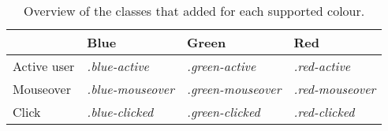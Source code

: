 \begin{table}%
	\begin{center}
		\begin{tabular}{l | l l l}
			\hline
			& \textbf{Blue}		& \textbf{Green} & \textbf{Red}
			\\
			\hline
			Active user &	\textit{.blue-active}	& \textit{.green-active} & \textit{.red-active} \\
			Mouseover 	&	\textit{.blue-mouseover}	& \textit{.green-mouseover} & \textit{.red-mouseover} \\
			Click				&	\textit{.blue-clicked}	& \textit{.green-clicked} & \textit{.red-clicked} \\
			\hline
		\end{tabular}
	\end{center}
	\caption{Overview of the classes that added for each supported colour.}
	\label{table:colours}
\end{table}




